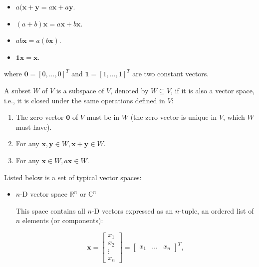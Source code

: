 \documentclass[10pt,b5paper,titlepage]{book}
\begin{document}
\begin{itemize}
\begin{enumerate}
                \begin{itemize}
                    \item $a (\mathbf{x} + \mathbf{y} = a \mathbf{x} + a \mathbf{y}$.
                    \item $(a + b) \mathbf{x} = a \mathbf{x} + b \mathbf{x}$.
                    \item $a b \mathbf{x} = a (b \mathbf{x})$.
                    \item $\mathbf{1} \mathbf{x} = \mathbf{x}$.
                \end{itemize}
        \end{enumerate}

        where $\mathbf{0} = [0, \ldots, 0]^{T}$ and $\mathbf{1} = [1, \ldots, 1]^{T}$
        are two constant vectors.

        A subset $W$ of $V$ is a subspace of $V$, denoted by $W \subseteq V$,
        if it is also a vector space, i.e., it is closed under the same
        operations defined in $V$:

        \begin{enumerate}
            \item The zero vector $\mathbf{0}$ of $V$ must be in $W$
                (the zero vector is unique in $V$, which $W$ must have).
            \item For any $\mathbf{x}, \mathbf{y} \in W, \mathbf{x} + \mathbf{y} \in W$.
            \item For any $\mathbf{x} \in W, a \mathbf{x} \in W$.
        \end{enumerate}

        Listed below is a set of typical vector spaces:

        \begin{itemize}
            \item $n$-D vector space $\mathbb{R}^{n}$ or $\mathbb{C}^{n}$

                This space contains all $n$-D vectors expressed as an  $n$-tuple,
                an ordered list of $n$ elements (or components):

                \begin{equation}
                    \mathbf{x} = \begin{bmatrix} x_1\\ x_2 \\ \vdots\\ x_n \end{bmatrix} =
                    \begin{bmatrix} x_1 & \ldots & x_n \end{bmatrix}^{T}
                ,\end{equation}


\end{itemize}
\end{itemize}
\end{document}
